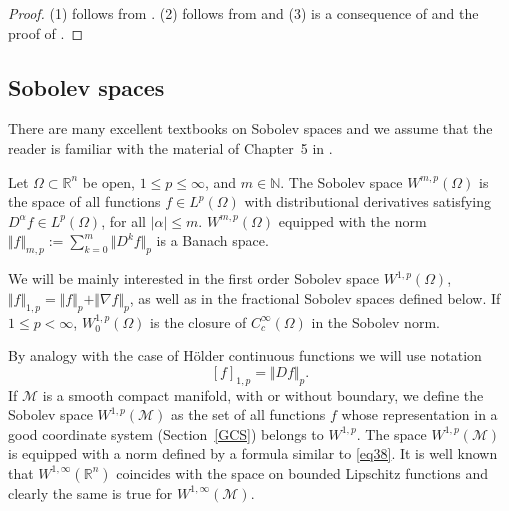 \documentclass[intlimits,12pt,reqno]{amsart}
\newcommand{\cM}{\mathcal M}
\newcommand{\bbbr}{\mathbb R}
\newcommand{\bbbn}{\mathbb N}
\numberwithin{equation}{section}
\theoremstyle{definition}
\begin{document}
\begin{proof}
(1) follows from . (2) follows from  and (3) is a consequence of  and the proof of .
\end{proof}

\subsection{Sobolev spaces}
\label{Sobolev}
There are many excellent textbooks on Sobolev spaces and we assume that the reader is familiar with the material of Chapter~5 in \cite{EG}.

Let $\Omega\subset\bbbr^n$ be open, $1\leq p\leq \infty$, and $m\in\bbbn$. The Sobolev space $W^{m,p}(\Omega)$ is the space of all functions $f\in L^p(\Omega)$ with distributional derivatives satisfying $D^\alpha f\in L^p(\Omega)$, for all $|\alpha|\leq m$. $W^{m,p}(\Omega)$ equipped with the norm
$\Vert f\Vert_{m,p}:=\sum_{k=0}^m\Vert D^k f\Vert_p$
is a Banach space.

We will be mainly interested in the first order Sobolev space $W^{1,p}(\Omega)$, $\Vert f\Vert_{1,p}=\Vert f\Vert_p+\Vert\nabla f\Vert_p$, as well as in the fractional Sobolev spaces defined below.
If $1\leq p<\infty$, $W^{1,p}_0(\Omega)$ is the closure of $C_c^\infty(\Omega)$ in the Sobolev norm.

By analogy with the case of H\"older continuous functions we will use notation
$$
[f]_{1,p}=\Vert Df\Vert_p.
$$
If $\cM$ is a smooth compact manifold, with or without boundary, we define the Sobolev space $W^{1,p}(\cM)$ as the set of all functions $f$ whose representation in a good coordinate system (Section~\ref{GCS}) belongs to $W^{1,p}$. The space $W^{1,p}(\cM)$ is equipped with a norm defined by  a formula similar to \eqref{eq38}.
It is well known that $W^{1,\infty}(\bbbr^n)$ coincides with the space on bounded Lipschitz functions and clearly the same is true for $W^{1,\infty}(\cM)$.
\end{document}

